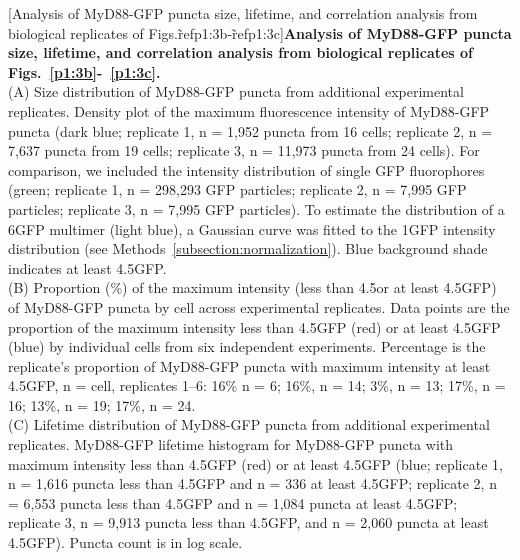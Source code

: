 \begin{centering}
\captionsetup{parbox=none}
[Analysis of MyD88-GFP puncta size, lifetime, and correlation analysis from biological replicates of Figs.\~ref{p1:3b}-\~ref{p1:3c}]{\textbf{Analysis of MyD88-GFP puncta size, lifetime, and correlation analysis from biological replicates of Figs.~\ref{p1:3b}-~\ref{p1:3c}.}
\vspace{1em}
\\
(A) Size distribution of MyD88-GFP puncta from additional experimental replicates. Density plot of the maximum fluorescence intensity of MyD88-GFP puncta (dark blue; replicate 1, n = 1,952 puncta from 16 cells; replicate 2, n = 7,637 puncta from 19 cells; replicate 3, n = 11,973 puncta from 24 cells). For comparison, we included the intensity distribution of single GFP fluorophores (green; replicate 1, n = 298,293 GFP particles; replicate 2, n = 7,995 GFP particles; replicate 3, n = 7,995 GFP particles). To estimate the distribution of a 6\times GFP multimer (light blue), a Gaussian curve was fitted to the 1\times GFP intensity distribution (see Methods~\ref{subsection:normalization}). Blue background shade indicates at least 4.5\times GFP.
\vspace{1em}
\\
(B) Proportion (\%) of the maximum intensity (less than 4.5\times or at least 4.5\times GFP) of MyD88-GFP puncta by cell across experimental replicates. Data points are the proportion of the maximum intensity less than 4.5\times GFP (red) or at least 4.5\times GFP (blue) by individual cells from six independent experiments. Percentage is the replicate’s proportion of MyD88-GFP puncta with maximum intensity at least 4.5\times GFP, n = cell, replicates 1--6: 16\% n = 6; 16\%, n = 14; 3\%, n = 13; 17\%, n = 16; 13\%, n = 19; 17\%, n = 24.
\vspace{1em}
\\
(C) Lifetime distribution of MyD88-GFP puncta from additional experimental replicates. MyD88-GFP lifetime histogram for MyD88-GFP puncta with maximum intensity less than 4.5\times GFP (red) or at least 4.5\times GFP (blue; replicate 1, n = 1,616 puncta less than 4.5\times GFP and n = 336 at least 4.5\times GFP; replicate 2, n = 6,553 puncta less than 4.5\times GFP and n = 1,084 puncta at least 4.5\times GFP; replicate 3, n = 9,913 puncta less than 4.5\times GFP, and n = 2,060 puncta at least 4.5\times GFP). Puncta count is in log scale.
\vspace{1em}
\\
}
\end{centering}
